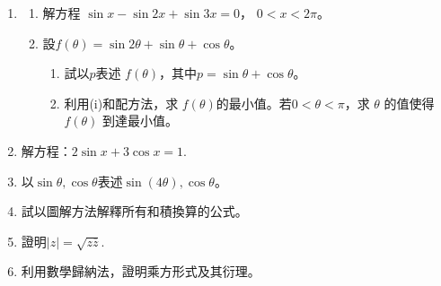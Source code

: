 \documentclass[12pt]{article}
\begin{document}
\begin{enumerate}
\begin{enumerate}
        \end{enumerate}
        \item \begin{enumerate}
            \item 解方程 $\sin{x}-\sin{2x}+\sin{3x}=0$， $0<x<2\pi$。
            \item 設$f(\theta)=\sin{2\theta}+\sin{\theta}+\cos{\theta}$。\begin{enumerate}
                \item 試以$p$表述 $f(\theta)$，其中$p=\sin{\theta}+\cos{\theta}$。
                \item 利用(i)和配方法，求 $f(\theta)$的最小值。若$0<\theta<\pi$，求 $\theta$ 的值使得 $f(\theta)$ 到達最小值。
            \end{enumerate}
        \end{enumerate}
        \item 解方程：$2\sin{x}+3\cos{x}=1$.
        \item 以$\sin{\theta},\cos{\theta}$表述$\sin(4\theta),\cos{\theta}$。
        \item 試以圖解方法解釋所有和積換算的公式。
        \item 證明$|z|=\sqrt{z\overline{z}}$.
        \item 利用數學歸納法，證明乘方形式及其衍理。
    \end{enumerate}
\end{document}
